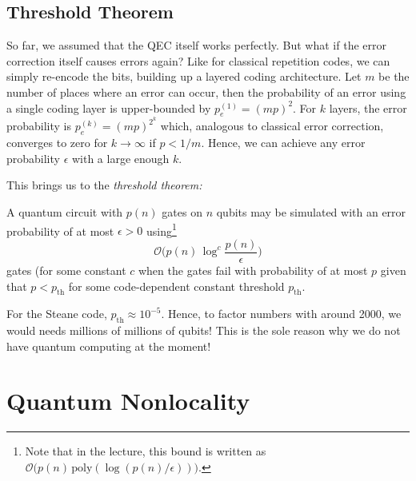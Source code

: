 	\section{Threshold Theorem}
		\label{sec:downer}

		So far, we assumed that the \ac{QEC} itself works perfectly. But what if the error correction itself causes errors again? Like for classical repetition codes, we can simply re-encode the bits, building up a layered coding architecture. Let \(m\) be the number of places where an error can occur, then the probability of an error using a single coding layer is upper-bounded by \( p_e^{(1)} = (mp)^2 \). For \(k\) layers, the error probability is \( p_e^{(k)} = (mp)^{2^k} \) which, analogous to classical error correction, converges to zero for \(k \to \infty\) if \(p < 1/m\). Hence, we can achieve any error probability \(\epsilon\) with a large enough \(k\).

		This brings us to the \emph{threshold theorem:}
		\begin{theorem}
			A quantum circuit with \(p(n)\) gates on \(n\) qubits may be simulated with an error probability of at most \(\epsilon > 0\) using\footnote{Note that in the lecture, this bound is written as \( \mathcal{O}\bigl( p(n) \, \mathrm{poly}( \log(p(n)/\epsilon) ) \bigr) \).}
			\begin{equation}
				\mathcal{O}\Biggl( p(n) \, \log^c \frac{p(n)}{\epsilon} \Biggr)
			\end{equation}
			gates (for some constant \(c\) when the gates fail with probability of at most \(p\) given that \(p < p_\mathrm{th}\) for some code-dependent constant threshold \(p_\mathrm{th}\).
		\end{theorem}
		For the Steane code, \( p_\mathrm{th} \approx 10^{-5} \). Hence, to factor numbers with around \num{2000}, we would needs millions of millions of qubits! This is the sole reason why we do not have quantum computing at the moment!

\chapter{Quantum Nonlocality} %
	\label{c:nonlocality}



